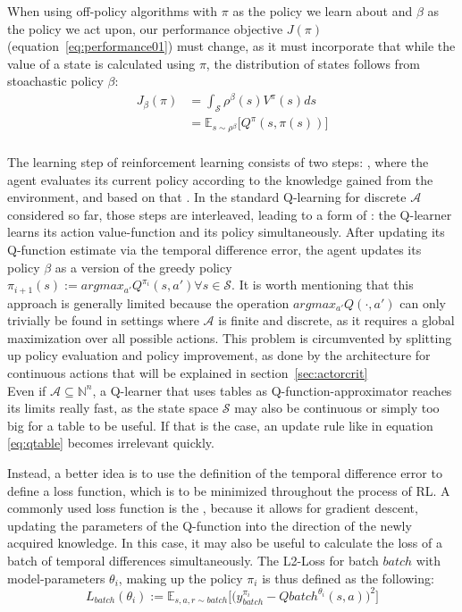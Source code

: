 When using off-policy algorithms with $\pi$ as the policy we learn about and $\beta$ as the policy we act upon, our performance objective $J(\pi)$ (equation~\ref{eq:performance01}) must change, as it must incorporate that while the value of a state is calculated using $\pi$, the distribution of states follows from stoachastic policy $\beta$: 
\begin{align} 
	J_\beta(\pi) &= \int_{\mathcal{S}} \rho^\beta(s) V^\pi(s) ds \nonumber\\
	&= \mathds{E}_{s\sim\rho^\beta} \big[Q^\pi(s, \pi(s)) \big] \label{eq:performance}
\end{align}\\

The learning step of reinforcement learning consists of two steps: , where the agent evaluates its current policy according to the knowledge gained from the environment, and based on that . In the standard Q-learning for discrete $\mathcal{A}$ considered so far, those steps are interleaved, leading to a form of : the Q-learner learns its action value-function and its policy simultaneously. After updating its Q-function estimate via the temporal difference error, the agent updates its policy $\beta$ as a  version of the greedy policy $\pi_{i+1}(s) := argmax_{a'} Q^{\pi_i}(s,a') \forall s \in \mathcal{S}$. It is worth mentioning that this approach is generally limited because the  operation $argmax_{a'}Q(\cdot, a')$ can only trivially be found in settings where $\mathcal{A}$ is finite and discrete, as it requires a global maximization over all possible actions. This problem is circumvented by splitting up policy evaluation and policy improvement, as done by the architecture for continuous actions that will be explained in section~\ref{sec:actorcrit}\\

Even if $\mathcal{A} \subseteq \mathds{N}^n$, a Q-learner that uses tables as Q-function-approximator reaches its limits really fast, as the state space $\mathcal{S}$ may also be continuous or simply too big for a table to be useful. If that is the case, an update rule like in equation \ref{eq:qtable} becomes irrelevant quickly. 

Instead, a better idea is to use the definition of the temporal difference error to define a loss function, which is to be minimized throughout the process of RL. A commonly used loss function is the , because it allows for gradient descent, updating the parameters of the Q-function into the direction of the newly acquired knowledge. In this case, it may also be useful to calculate the loss of a batch of temporal differences simultaneously. The L2-Loss for batch $batch$ with model-parameters $\theta_i$, making up the policy $\pi_i$ is thus defined as the following: 
\begin{equation} \label{l2loss}
	L_{batch}(\theta_i) := \mathds{E}_{s,a,r \sim batch} \Big[ \big( y_{batch}^{\pi_i} - Q{batch}^{\theta_i}(s, a)\big)^2 \Big]
\end{equation}







